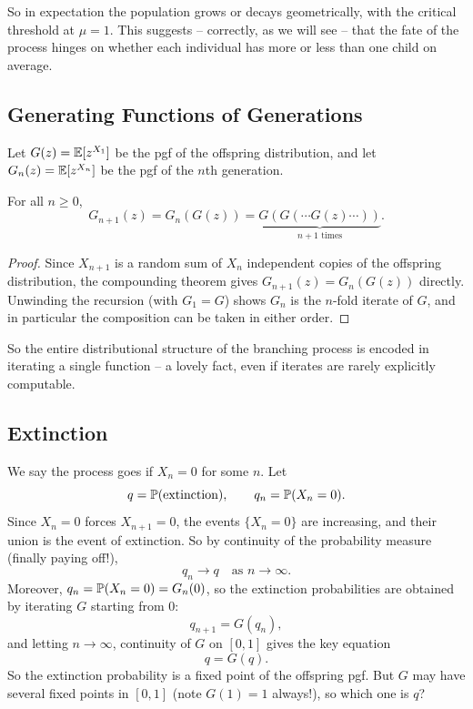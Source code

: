 \documentclass[a4paper]{scrartcl}
\begin{document}
So in expectation the population grows or decays geometrically, with the critical threshold at $\mu = 1$. This suggests -- correctly, as we will see -- that the fate of the process hinges on whether each individual has more or less than one child on average.

\subsection{Generating Functions of Generations}

Let $G(z) = \mathbb{E}[z^{X_1}]$ be the pgf of the offspring distribution, and let $G_n(z) = \mathbb{E}[z^{X_n}]$ be the pgf of the $n$th generation.

\begin{theorem}
	For all $n \geq 0$,
	$$
	G_{n + 1}(z) = G_n(G(z)) = \underbrace{G(G(\cdots G(z) \cdots))}_{n + 1 \text{ times}}.
	$$
\end{theorem}
\begin{proof}
	Since $X_{n+1}$ is a random sum of $X_n$ independent copies of the offspring distribution, the compounding theorem gives $G_{n + 1}(z) = G_n(G(z))$ directly. Unwinding the recursion (with $G_1 = G$) shows $G_n$ is the $n$-fold iterate of $G$, and in particular the composition can be taken in either order.
\end{proof}

So the entire distributional structure of the branching process is encoded in iterating a single function -- a lovely fact, even if iterates are rarely explicitly computable.

\subsection{Extinction}

We say the process goes  if $X_n = 0$ for some $n$. Let
$$
q = \mathbb{P}(\text{extinction}), \qquad q_n = \mathbb{P}(X_n = 0).
$$
Since $X_n = 0$ forces $X_{n+1} = 0$, the events $\{X_n = 0\}$ are increasing, and their union is the event of extinction. So by continuity of the probability measure (finally paying off!),
$$
q_n \longrightarrow q \quad \text{as } n \rightarrow \infty.
$$
Moreover, $q_n = \mathbb{P}(X_n = 0) = G_n(0)$, so the extinction probabilities are obtained by iterating $G$ starting from $0$:
$$
q_{n + 1} = G(q_n),
$$
and letting $n \rightarrow \infty$, continuity of $G$ on $[0, 1]$ gives the key equation
$$
q = G(q).
$$
So the extinction probability is a fixed point of the offspring pgf. But $G$ may have several fixed points in $[0,1]$ (note $G(1) = 1$ always!), so which one is $q$?
\end{document}
